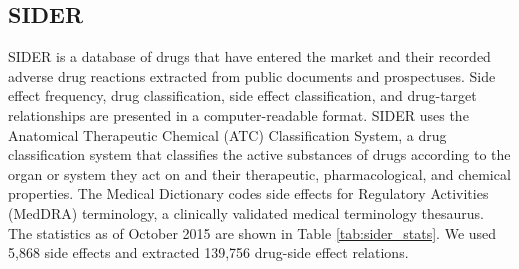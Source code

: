 \subsection{SIDER}
SIDER \cite{kuhn2010side, kuhn2016sider} is a database of drugs that have entered the market and their recorded adverse drug reactions extracted from public documents and prospectuses. Side effect frequency, drug classification, side effect classification, and drug-target relationships are presented in a computer-readable format. SIDER uses the Anatomical Therapeutic Chemical (ATC) Classification System, a drug classification system that classifies the active substances of drugs according to the organ or system they act on and their therapeutic, pharmacological, and chemical properties. The Medical Dictionary codes side effects for Regulatory Activities (MedDRA) terminology, a clinically validated medical terminology thesaurus. The statistics as of October 2015 are shown in Table \ref{tab:sider_stats}. We used 5,868 side effects and extracted 139,756 drug-side effect relations.

